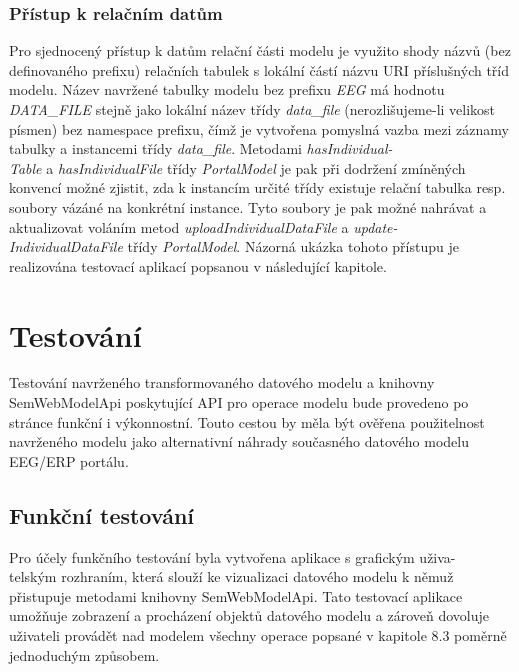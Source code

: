 \documentclass{projekt}
\begin{document}
\subsection{Přístup k relačním datům}
\hspace{0.65cm}Pro sjednocený přístup k datům relační části modelu je využito shody názvů (bez definovaného prefixu) relačních tabulek s lokální částí názvu URI příslušných tříd modelu. Název navržené tabulky modelu bez prefixu {\it EEG} má hodnotu {\it DATA\_FILE} stejně jako lokální název třídy {\it data\_file} (nerozlišujeme-li velikost písmen) bez namespace prefixu, čímž je vytvořena pomyslná vazba mezi záznamy tabulky a instancemi třídy {\it data\_file}. Metodami {\it hasIndividual-\\Table} a {\it hasIndividualFile} třídy {\it PortalModel} je pak při dodržení zmíněných konvencí možné zjistit, zda k instancím určité třídy existuje relační tabulka resp. soubory vázáné na konkrétní instance. Tyto soubory je pak možné nahrávat a aktualizovat voláním metod {\it uploadIndividualDataFile} a {\it update-\\IndividualDataFile} třídy {\it PortalModel}. Názorná ukázka tohoto přístupu je realizována testovací aplikací popsanou v následující kapitole.


\chapter{Testování}
\hspace{0.65cm}Testování navrženého transformovaného datového modelu a knihovny SemWebModelApi poskytující API pro operace modelu bude provedeno po stránce funkční i výkonnostní. Touto cestou by měla být ověřena použitelnost navrženého modelu jako alternativní náhrady současného datového modelu EEG/ERP portálu.

\section{Funkční testování}
\hspace{0.65cm}Pro účely funkčního testování byla vytvořena aplikace s grafickým uživa-\\telským rozhraním, která slouží ke vizualizaci datového modelu k němuž přistupuje metodami knihovny SemWebModelApi. Tato testovací aplikace umožňuje zobrazení a procházení objektů datového modelu a zároveň dovoluje uživateli provádět nad modelem všechny operace popsané v kapitole 8.3 poměrně jednoduchým způsobem. 
\end{document}
